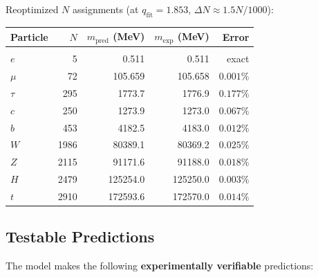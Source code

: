 \documentclass[11pt]{article}
\begin{document}
Reoptimized $N$ assignments
(at $q_{\mathrm{fit}} = 1.853$, $\Delta N \approx 1.5N/1000$):
\begin{center}
\renewcommand{\arraystretch}{1.2}
\begin{tabular}{@{}lrrrr@{}}
Particle & $N$ & $m_{\mathrm{pred}}$ (MeV)
  & $m_{\mathrm{exp}}$ (MeV) & Error
  \\[2pt]\hline\\[-6pt]
$e$   & 5    & 0.511     & 0.511     & exact \\
$\mu$ & 72   & 105.659   & 105.658   & $0.001\%$ \\
$\tau$& 295  & 1773.7    & 1776.9    & $0.177\%$ \\
$c$   & 250  & 1273.9    & 1273.0    & $0.067\%$ \\
$b$   & 453  & 4182.5    & 4183.0    & $0.012\%$ \\
$W$   & 1986 & 80389.1   & 80369.2   & $0.025\%$ \\
$Z$   & 2115 & 91171.6   & 91188.0   & $0.018\%$ \\
$H$   & 2479 & 125254.0  & 125250.0  & $0.003\%$ \\
$t$   & 2910 & 172593.6  & 172570.0  & $0.014\%$ \\
\end{tabular}
\end{center}

\subsection{Testable Predictions}
\label{sec:N4_predictions}

The model makes the following \textbf{experimentally verifiable}
predictions:
\end{document}
